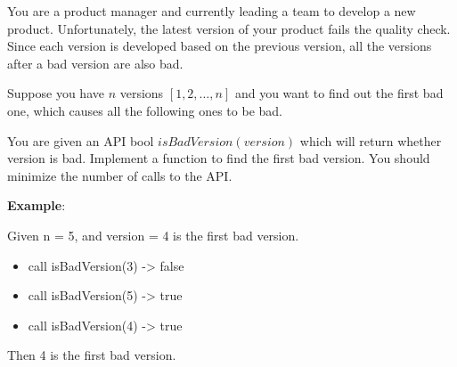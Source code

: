 \documentclass[a4paper]{article}
\begin{document}
You are a product manager and currently leading a team to develop a new product. Unfortunately, the latest version of your product fails the quality check. Since each version is developed based on the previous version, all the versions after a bad version are also bad.

Suppose you have $n$ versions $[1, 2, \ldots, n]$ and you want to find out the first bad one, which causes all the following ones to be bad.

You are given an API bool $isBadVersion(version)$ which will return whether version is bad. Implement a function to find the first bad version. You should minimize the number of calls to the API.

\LINE

\textbf{Example}:

Given n = 5, and version = 4 is the first bad version.
\begin{itemize}
\item call isBadVersion(3) -> false
\item call isBadVersion(5) -> true
\item call isBadVersion(4) -> true
\end{itemize}
Then 4 is the first bad version. 
\end{document}
